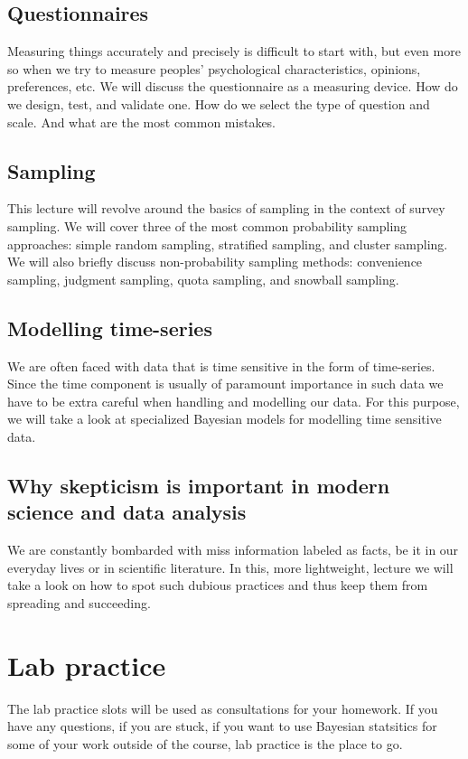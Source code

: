 \documentclass[fleqn,moreauthors,10pt]{ds_report}
\begin{document}
\subsection*{Questionnaires}

Measuring things accurately and precisely is difficult to start with, but even more so when we try to measure peoples' psychological characteristics, opinions, preferences, etc. We will discuss the questionnaire as a measuring device. How do we design, test, and validate one. How do we select the type of question and scale. And what are the most common mistakes.

\subsection*{Sampling}

This lecture will revolve around the basics of sampling in the context of survey sampling. We will cover three of the most common probability sampling approaches: simple random sampling, stratified sampling, and cluster sampling. We will also briefly discuss non-probability sampling methods: convenience sampling, judgment sampling, quota sampling, and snowball sampling.

\subsection*{Modelling time-series}

We are often faced with data that is time sensitive in the form of time-series. Since the time component is usually of paramount importance in such data we have to be extra careful when handling and modelling our data. For this purpose, we will take a look at specialized Bayesian models for modelling time sensitive data.

\subsection*{Why skepticism is important in modern science and data analysis}

We are constantly bombarded with miss information labeled as facts, be it in our everyday lives or in scientific literature. In this, more lightweight, lecture we will take a look on how to spot such dubious practices and thus keep them from spreading and succeeding.

\section*{Lab practice}

The lab practice slots will be used as consultations for your homework. If you have any questions, if you are stuck, if you want to use Bayesian statsitics for some of your work outside of the course, lab practice is the place to go.
\end{document}
